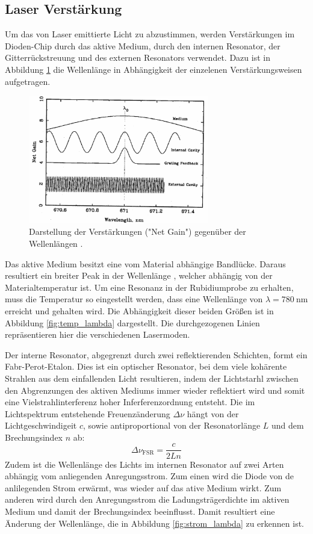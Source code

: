 \subsection{Laser Verstärkung}
Um das von Laser emittierte Licht zu abzustimmen, werden Verstärkungen im
Dioden-Chip durch das aktive Medium, durch den internen Resonator, der Gitterrückstreuung
und des externen Resonators verwendet. Dazu ist in Abbildung \ref{fig:net_gain}
die Wellenlänge in Abhängigkeit der einzelenen Verstärkungsweisen aufgetragen.
\begin{figure}[htb]
  \centering
  \includegraphics[width=0.7\textwidth]{images/gain-lambda.pdf}
  \caption{Darstellung der Verstärkungen ("Net Gain") gegenüber der Wellenlängen
  \cite{anleitung}.}
  \label{fig:net_gain}
\end{figure}

Das aktive Medium besitzt eine vom Material abhängige Bandlücke. Daraus resultiert
ein breiter Peak in der Wellenlänge \lambda, welcher abhängig von der
Materialtemperatur ist. Um eine Resonanz in der Rubidiumprobe zu erhalten, muss
die Temperatur so eingestellt werden, dass eine Wellenlänge von $\lambda = \SI{780}{\nano\meter}$
erreicht und gehalten wird. Die Abhängigkeit dieser beiden Größen ist in Abbildung
\ref{fig:temp_lambda} dargestellt. Die durchgezogenen Linien repräsentieren hier
die verschiedenen Lasermoden.

Der interne Resonator, abgegrenzt durch zwei reflektierenden Schichten, formt ein
Fabr-Perot-Etalon. Dies ist ein optischer Resonator, bei dem viele kohärente Strahlen
aus dem einfallenden Licht resultieren, indem der Lichtstarhl zwischen den
Abgrenzungen des aktiven Mediums immer wieder reflektiert wird und somit eine
Vielstrahlinterferenz hoher Inferferenzordnung entsteht. Die im Lichtspektrum
entstehende Freuenzänderung $\Delta\nu$ hängt von der Lichtgeschwindigeit $c$,
sowie antiproportional von der Resonatorlänge $L$ und dem Brechungsindex $n$ ab:
\begin{equation}
  \Delta\nu_\text{FSR} = \frac{c}{2Ln}
\end{equation}
Zudem ist die Wellenlänge des Lichts im internen Resonator auf zwei Arten abhängig
vom anliegenden Anregungsstrom. Zum einen wird die Diode von de anlilegenden Strom
erwärmt, was wieder auf das ative Medium wirkt. Zum anderen wird durch den Anregungsstrom
die Ladungsträgerdichte im aktiven Medium und damit der Brechungsindex beeinflusst.
Damit resultiert eine Änderung der Wellenlänge, die in Abbildung \ref{fig:strom_lambda}
zu erkennen ist.

